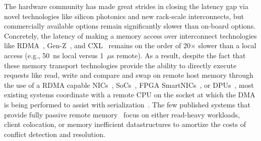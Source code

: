 The hardware community has made great strides in closing the latency gap via
novel technologies like silicon photonics and new rack-scale interconnects, but
commercially available options remain significantly slower than on-board
options.  Concretely, the latency of making a memory access over interconnect
technologies like RDMA~\cite{infiniband-spec}, Gen-Z~\cite{genz}, and
CXL~\cite{cxl} 
remains on the order of 20$\times$ slower than a local access (e.g., 50~ns local
versus 1~$\mu$s remote).  As a result, despite the fact that these memory
transport technologies provide the ability to directly execute requests like
read, write and compare and swap on remote host memory through the use of a RDMA
capable NICs~\cite{connectx}, SoCs~\cite{cavium}, FPGA
SmartNICs~\cite{corundum,kv-direct}, or DPUs~\cite{fungible}, most existing
systems coordinate with a remote CPU on the socket at which the DMA is being
performed to assist with serialization~\cite{cliquemap,erpc,herd,sonuma,storm}.
The few published systems that provide fully passive remote
memory~\cite{reigons,clover,sherman,race} focus on either read-heavy workloads,
client colocation, or memory inefficient datastructures to amortize the costs of
conflict detection and resolution.




